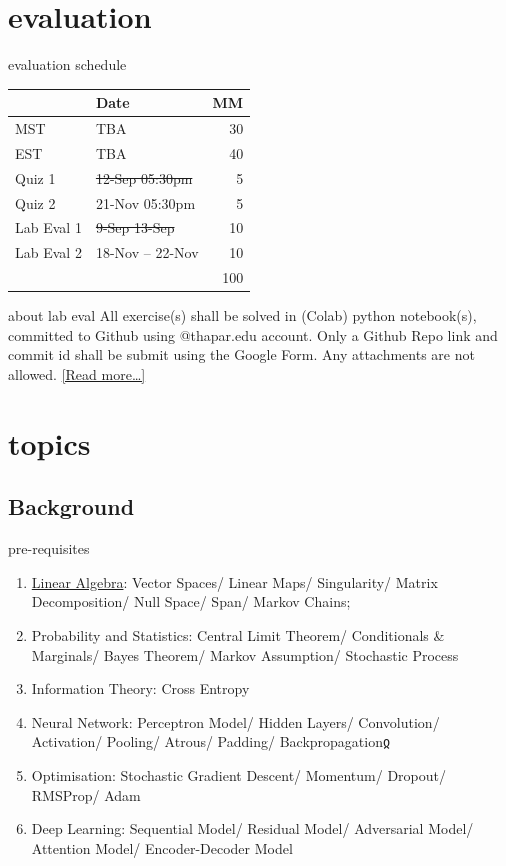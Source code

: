 \documentclass[aspectratio=169,xcolor={dvipsnames,svgnames}]{beamer}
\begin{document}
\section{evaluation}
\label{sec:org27d22e2}

\begin{frame}[label=evaluation-schedule]{evaluation schedule}
\begin{center}
\begin{tabular}{llr}
 & Date & MM\\[0pt]
\hline
MST & TBA & 30\\[0pt]
EST & TBA & 40\\[0pt]
Quiz 1 & \sout{12-Sep 05:30pm} & 5\\[0pt]
Quiz 2 & 21-Nov 05:30pm & 5\\[0pt]
Lab Eval 1 & \sout{9-Sep 13-Sep} & 10\\[0pt]
Lab Eval 2 & 18-Nov -- 22-Nov & 10\\[0pt]
\hline
 &  & 100\\[0pt]
\end{tabular}
\end{center}
\end{frame}

\begin{frame}[label={sec:about-lab-eval}]{about lab eval}
All exercise(s) shall be solved in (Colab) python
notebook(s), committed to Github using @thapar.edu
account.  Only a Github Repo link and commit id shall
be submit using the Google Form. Any attachments are
\alert{not} allowed.  \href{./about-lab-eval/}{[Read more\ldots{}]​}
\end{frame}

\section{topics}
\label{schedule-of-topics}
\subsection{Background}
\label{sec:org4d73964}
\begin{frame}[label={sec:org738baf7}]{pre-requisites}
\begin{enumerate}
\item \href{https://www.3blue1brown.com/topics/linear-algebra}{Linear Algebra}: Vector Spaces/ Linear Maps/
Singularity/ Matrix Decomposition/ Null
Space/ Span/ Markov Chains;
\item Probability and Statistics: Central Limit
Theorem/ Conditionals \& Marginals/ Bayes
Theorem/ Markov Assumption/ Stochastic
Process
\item Information Theory: Cross Entropy
\item Neural Network: Perceptron Model/ Hidden
Layers/ Convolution/ Activation/ Pooling/
Atrous/ Padding/ Backpropagationჲ
\item Optimisation: Stochastic Gradient Descent/
Momentum/ Dropout/ RMSProp/ Adam
\item Deep Learning: Sequential Model/ Residual Model/
Adversarial Model/ Attention Model/ Encoder-Decoder
Model
\end{enumerate}
\end{frame}
\end{document}
